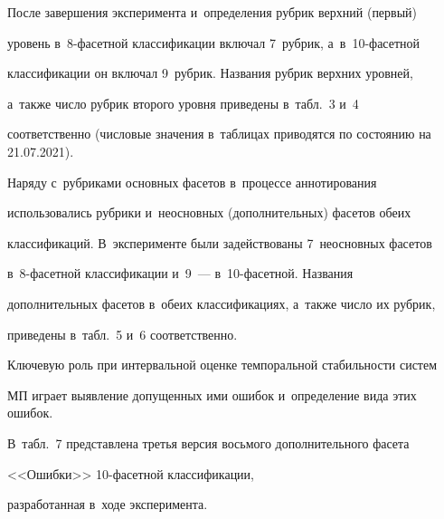   


  После завершения эксперимента и~определения рубрик верхний (первый) 


уровень в~8-фа\-сет\-ной классификации включал 7~руб\-рик, а~в~10-фа\-сет\-ной 


классификации он включал 9~руб\-рик. Названия рубрик верхних уровней,  


а~так\-же число руб\-рик второго уровня приведены в~табл.~3 и~4 


соответственно (числовые значения в~таблицах приводятся по состоянию на 21.07.2021).


  


  


  Наряду с~рубриками основных фасетов в~процессе аннотирования 


использовались рубрики и~неосновных (дополнительных) фасетов обеих 


классификаций. В~эксперименте были задействованы 7~неосновных фасетов  


в~8-фа\-сет\-ной классификации и~9~--- в~10-фа\-сет\-ной. Названия 


дополнительных фасетов в~обеих классификациях, а~также число их руб\-рик, 


приведены в~табл.~5 и~6 со\-от\-вет\-ст\-венно.


  





 





  Ключевую роль при интервальной оценке темпоральной стабильности систем 


МП играет выявление допущенных ими ошибок  и~определение вида этих ошибок.


В~табл.~7 представлена третья версия восьмого дополнительного фасета 


<<Ошибки>>  10-фа\-сет\-ной классификации,


 разработанная в~ходе эксперимента. \linebreak\vspace*{-12pt}





